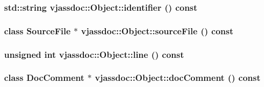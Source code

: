 \hypertarget{classvjassdoc_1_1Object_c2927d3fd29e7b9ba25a481f6c0bcd75}{
\subsubsection{\setlength{\rightskip}{0pt plus 5cm}std::string vjassdoc::Object::identifier () const}}
\label{classvjassdoc_1_1Object_c2927d3fd29e7b9ba25a481f6c0bcd75}


\hypertarget{classvjassdoc_1_1Object_c09bed4bd1d246d9aa8b96b9317a2b4a}{
\subsubsection{\setlength{\rightskip}{0pt plus 5cm}class {\bf SourceFile} $\ast$ vjassdoc::Object::sourceFile () const}}
\label{classvjassdoc_1_1Object_c09bed4bd1d246d9aa8b96b9317a2b4a}


\hypertarget{classvjassdoc_1_1Object_e0124e6b7fd1642276274c058b280abf}{
\subsubsection{\setlength{\rightskip}{0pt plus 5cm}unsigned int vjassdoc::Object::line () const}}
\label{classvjassdoc_1_1Object_e0124e6b7fd1642276274c058b280abf}


\hypertarget{classvjassdoc_1_1Object_57a2a1b81c481ee49738df29f1f63b2b}{
\subsubsection{\setlength{\rightskip}{0pt plus 5cm}class {\bf DocComment} $\ast$ vjassdoc::Object::docComment () const}}
\label{classvjassdoc_1_1Object_57a2a1b81c481ee49738df29f1f63b2b}


